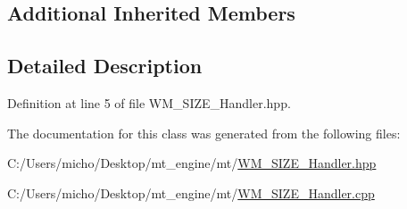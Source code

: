 \subsection*{Additional Inherited Members}


\subsection{Detailed Description}


Definition at line 5 of file W\+M\+\_\+\+S\+I\+Z\+E\+\_\+\+Handler.\+hpp.



The documentation for this class was generated from the following files\+:\begin{DoxyCompactItemize}
\item 
C\+:/\+Users/micho/\+Desktop/mt\+\_\+engine/mt/\hyperlink{_w_m___s_i_z_e___handler_8hpp}{W\+M\+\_\+\+S\+I\+Z\+E\+\_\+\+Handler.\+hpp}\item 
C\+:/\+Users/micho/\+Desktop/mt\+\_\+engine/mt/\hyperlink{_w_m___s_i_z_e___handler_8cpp}{W\+M\+\_\+\+S\+I\+Z\+E\+\_\+\+Handler.\+cpp}\end{DoxyCompactItemize}

